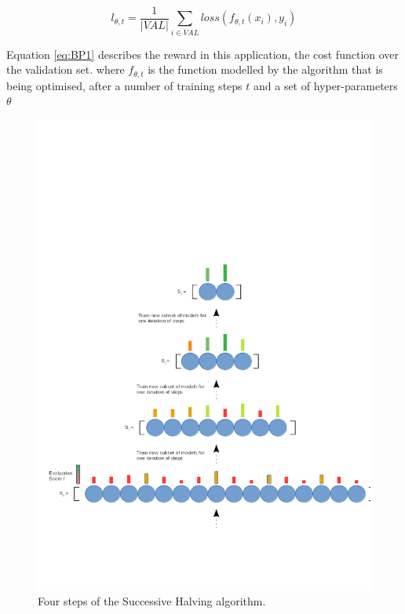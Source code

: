 \documentclass{article}
\begin{document}
		\begin{equation}\label{eq:BP1}	l_{\theta,t} = \frac{1}{|VAL|} \sum_{i \in VAL} loss(f_{\theta,t}(x_i),y_i)\end{equation}



	Equation \ref{eq:BP1} describes the reward in this application, the cost function over the validation set. where \(f_{\theta,t}\) is the function modelled by the algorithm that is being optimised, after a number of training steps \(t\) and a set of hyper-parameters \(\theta\)


			\begin{figure}[h]
			
			\centering 
			\includegraphics[trim= 100 100 100 300 ,scale=0.45]{bandit.png}


			\caption{Four steps of the Successive Halving algorithm. }
			\label{fig:BP1}


			\end{figure}
\end{document}
